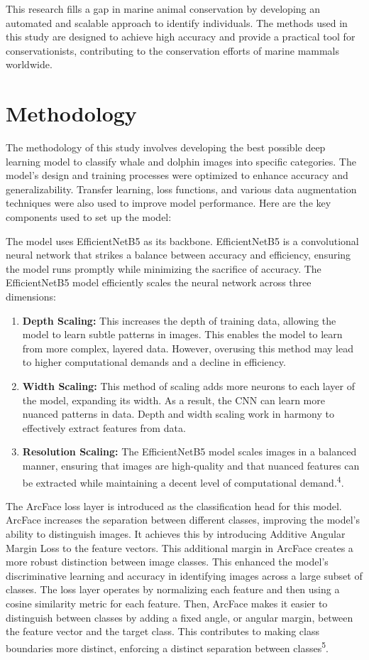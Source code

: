 \documentclass[twocolumn]{article}
\begin{document}
This research fills a gap in marine animal conservation by developing an automated and scalable approach to identify individuals. The methods used in this study are designed to achieve high accuracy and provide a practical tool for conservationists, contributing to the conservation efforts of marine mammals worldwide. 

\section{Methodology}
The methodology of this study involves developing the best possible deep learning model to classify whale and dolphin images into specific categories. The model’s design and training processes were optimized to enhance accuracy and generalizability. Transfer learning, loss functions, and various data augmentation techniques were also used to improve model performance. Here are the key components used to set up the model:

The model uses EfficientNetB5 as its backbone. EfficientNetB5 is a convolutional neural network that strikes a balance between accuracy and efficiency, ensuring the model runs promptly while minimizing the sacrifice of accuracy. The EfficientNetB5 model efficiently scales the neural network across three dimensions: 

\begin{enumerate}
    \item \textbf{Depth Scaling:} This increases the depth of training data, allowing the model to learn subtle patterns in images. This enables the model to learn from more complex, layered data. However, overusing this method may lead to higher computational demands and a decline in efficiency.
    \item \textbf{Width Scaling:} This method of scaling adds more neurons to each layer of the model, expanding its width. As a result, the CNN can learn more nuanced patterns in data. Depth and width scaling work in harmony to effectively extract features from data.
    \item \textbf{Resolution Scaling:} The EfficientNetB5 model scales images in a balanced manner, ensuring that images are high-quality and that nuanced features can be extracted while maintaining a decent level of computational demand.\textsuperscript{4}.
\end{enumerate}

The ArcFace loss layer is introduced as the classification head for this model. ArcFace increases the separation between different classes, improving the model’s ability to distinguish images. It achieves this by introducing Additive Angular Margin Loss to the feature vectors. This additional margin in ArcFace creates a more robust distinction between image classes. This enhanced the model’s discriminative learning and accuracy in identifying images across a large subset of classes. The loss layer operates by normalizing each feature and then using a cosine similarity metric for each feature. Then, ArcFace makes it easier to distinguish between classes by adding a fixed angle, or angular margin, between the feature vector and the target class. This contributes to making class boundaries more distinct, enforcing a distinct separation between classes\textsuperscript{5}.
\end{document}
